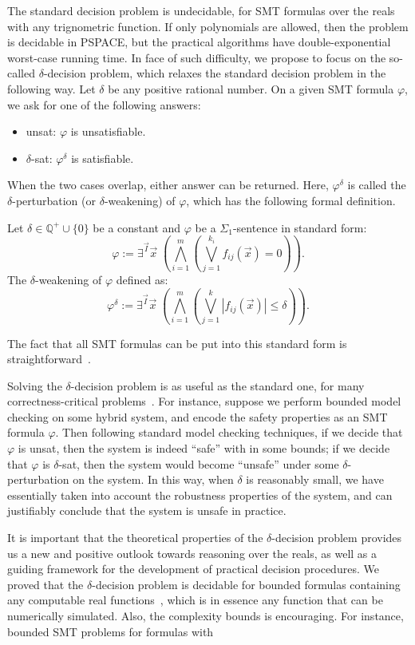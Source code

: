 \documentclass[envcountsect]{llncs}
\begin{document}
The standard decision problem is undecidable, for SMT formulas
over the reals with any trignometric function. If only polynomials are allowed,
then the problem is decidable in {\sf PSPACE}, but the practical algorithms have
double-exponential worst-case running time. In face of such difficulty, we
propose to focus on the so-called $\delta$-decision problem, which relaxes the
standard decision problem in the following way. Let $\delta$ be any positive
rational number. On a given SMT formula $\varphi$, we ask for one of the
following answers:
\begin{itemize}
 \item {\sf unsat}: $\varphi$ is unsatisfiable.
 \item {\sf $\delta$-sat}: $\varphi^{\delta}$ is satisfiable.
\end{itemize}
When the two cases overlap, either answer can be returned. Here,
$\varphi^{\delta}$ is called the $\delta$-perturbation (or $\delta$-weakening)
of $\varphi$, which has the following formal definition. 
\begin{definition}
 Let $\delta\in \mathbb{Q}^+\cup\{0\}$ be a constant and $\varphi$ be a
$\Sigma_1$-sentence in standard form:
\[\varphi:= \exists^{\vec I}\vec x\;(\bigwedge_{i=1}^m (\bigvee_{j=1}^{k_i}
f_{ij}(\vec x)= 0)).
\]
The $\delta$-weakening of $\varphi$ defined as:
\[\varphi^{\delta}:= \exists^{\vec I} \vec x\;(\bigwedge_{i=1}^m(\bigvee_{j=1}^k
|f_{ij}(\vec x)|\leq \delta)).\]
\end{definition}
The fact that all SMT formulas can be put into this standard form is
straightforward~\cite{}. 

Solving the $\delta$-decision problem is as useful as the standard one, for many
correctness-critical problems~\cite{}. For instance, suppose we perform bounded
model checking on some hybrid system, and encode the safety properties as an SMT
formula $\varphi$. Then following standard model checking techniques, if we
decide that $\varphi$ is {\sf unsat}, then the system is indeed ``safe'' with in
some bounds; if we decide that $\varphi$ is {\sf $\delta$-sat}, then the system
would become ``unsafe'' under some $\delta$-perturbation on the system. In this
way, when $\delta$ is reasonably small, we have essentially taken into account 
the robustness properties of the system, and can justifiably conclude that the
system is unsafe in practice. 

It is important that the theoretical properties of the $\delta$-decision problem
provides us a new and positive outlook towards reasoning over the reals, as well
as a guiding framework for the development of practical decision procedures. We
proved that the $\delta$-decision problem is decidable for bounded formulas
containing any computable real functions~\cite{}, which is in essence any
function that can be numerically simulated. Also, the complexity bounds is
encouraging. For instance, bounded SMT problems for formulas with 
\end{document}
